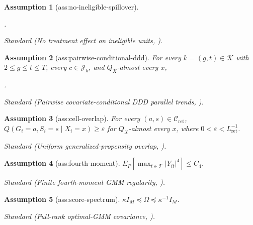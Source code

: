 \documentclass{article}
\newtheorem{assumption}{Assumption}
\begin{document}
\begin{assumption}[ass:no-ineligible-spillover]\label{ass:no-ineligible-spillover}
\leavevmode\par\noindent {}\par\noindent.
\par\smallskip\noindent\emph{Standard} (No treatment effect on ineligible units, \cite{OrtizVillavicencioSantAnna2025}).
\end{assumption}

\begin{assumption}[ass:pairwise-conditional-ddd]\label{ass:pairwise-conditional-ddd}
For every \(k=(g,t)\in\mathcal K\) with \(2\le g\le t\le T\), every \(c\in\mathcal J_k\), and \(Q_X\)-almost every \(x\), \leavevmode\par\noindent {}\par\noindent.
\par\smallskip\noindent\emph{Standard} (Pairwise covariate-conditional DDD parallel trends, \cite{OrtizVillavicencioSantAnna2025}).
\end{assumption}

\begin{assumption}[ass:cell-overlap]\label{ass:cell-overlap}
For every \((a,s)\in\mathcal C_{\mathrm{ret}}\), \(Q(G_i=a,S_i=s\mid X_i=x)\ge\varepsilon\) for \(Q_X\)-almost every \(x\), where \(0<\varepsilon<L_{\mathrm{ret}}^{-1}\).
\par\smallskip\noindent\emph{Standard} (Uniform generalized-propensity overlap, \cite{OrtizVillavicencioSantAnna2025}).
\end{assumption}

\begin{assumption}[ass:fourth-moment]\label{ass:fourth-moment}
\(E_P[\max_{t\in\mathcal T}|Y_{it}|^4]\le C_4\).
\par\smallskip\noindent\emph{Standard} (Finite fourth-moment GMM regularity, \cite{Hansen1982}).
\end{assumption}

\begin{assumption}[ass:score-spectrum]\label{ass:score-spectrum}
\(\kappa I_M\preceq\Omega\preceq\kappa^{-1}I_M\).
\par\smallskip\noindent\emph{Standard} (Full-rank optimal-GMM covariance, \cite{Hansen1982}).
\end{assumption}
\end{document}
